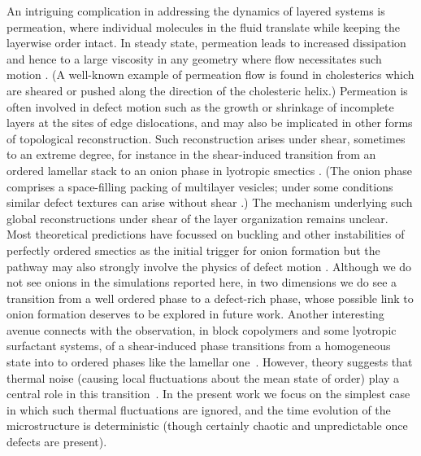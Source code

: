 \documentclass[8.5pt,twoside,twocolumn]{article}
\begin{document}
An intriguing complication in addressing the dynamics of layered systems
is permeation,
where individual molecules in the fluid translate while keeping the
layerwise order intact. In steady state, permeation leads to increased dissipation
and hence to a large viscosity in any geometry where flow necessitates such motion \cite{deGennes}. (A well-known example of permeation flow
is found in cholesterics which are sheared or pushed along the direction
of the cholesteric helix.) Permeation is often involved in defect motion such as the growth or shrinkage of incomplete layers at the sites of edge dislocations, and may also be implicated in other forms of topological reconstruction. Such reconstruction arises under shear, sometimes to an extreme degree, for instance in the shear-induced transition from an ordered lamellar stack to an onion phase in lyotropic smectics \cite{Diat93,Panizza96,Iwashita07,Gradzielski03}. (The onion phase comprises a space-filling packing of multilayer vesicles; under some conditions similar defect textures can arise without shear \cite{Gomati87,Boltenhagen92,Fournier94,Ramos04}.) The mechanism underlying such global reconstructions under shear of the layer organization remains unclear. Most theoretical predictions have focussed on buckling and other instabilities of perfectly ordered smectics as the initial trigger for onion formation \cite{Zilman99,Courbin02,Guo2002,Soddemann2004, Stewart2009} but the pathway may also strongly involve the physics of defect motion \cite{Zipfel99, Leon00}. Although we do not see onions in the simulations reported here, in two dimensions we do see a transition from a well ordered phase to a defect-rich phase, whose possible link to onion formation deserves to be explored in future work. Another interesting avenue connects with the observation, in block copolymers and some lyotropic surfactant systems, of a shear-induced
phase transitions from a homogeneous state into to ordered phases
like the lamellar one~\cite{Cates89,Koppi93,Fredrickson94}. However, theory suggests that thermal noise (causing local fluctuations about the mean state of order) play a central role in this transition~\cite{Cates89}. In the present work we focus on the simplest case in which such thermal fluctuations are ignored, and the time evolution of the microstructure is deterministic (though certainly chaotic and unpredictable
once defects are present).
\end{document}

